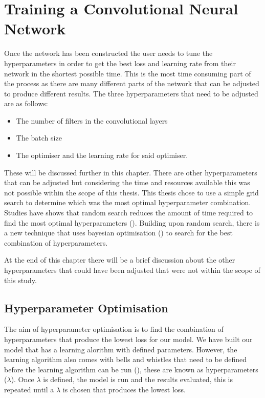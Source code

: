 \chapter{Training a Convolutional Neural Network}
Once the network has been constructed the user needs to tune the hyperparameters in order to get the best loss and learning rate from their network in the shortest possible time. This is the most time consuming part of the process as there are many different parts of the network that can be adjusted to produce different results. The three hyperparameters that need to be adjusted are as follows:
\begin{itemize}
    \item The number of filters in the convolutional layers
    \item The batch size
    \item The optimiser and the learning rate for said optimiser.
\end{itemize}
These will be discussed further in this chapter. There are other hyperparameters that can be adjusted but considering the time and resources available this was not possible within the scope of this thesis. This thesis chose to use a simple grid search to determine which was the most optimal hyperparameter combination. Studies have shows that random search reduces the amount of time required to find the most optimal hyperparameters (\cite{bergstra12}). Building upon random search, there is a new technique that uses bayesian optimisation (\cite{snoek12}) to search for the best combination of hyperparameters.
\par
At the end of this chapter there will be a brief discussion about the other hyperparameters that could have been adjusted that were not within the scope of this study. 
\section{Hyperparameter Optimisation}
The aim of hyperparameter optimisation is to find the combination of hyperparameters that produce the lowest loss for our model. We have built our model that has a learning alorithm with defined parameters. However, the learning algorithm also comes with bells and whistles that need to be defined before the learning algorithm can be run (\cite{bergstra12}), these are known as hyperparameters ($\lambda$). Once $\lambda$ is defined, the model is run and the results evaluated, this is repeated until a $\lambda$ is chosen that produces the lowest loss. 
